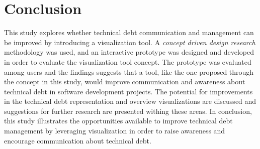 \section{Conclusion}
This study explores whether technical debt communication and management can be improved by introducing a visualization tool.
A \textit{concept driven design research} methodology was used, and an interactive prototype was designed and developed in order to evaluate the visualization tool concept.
The prototype was evaluated among users and the findings suggests that a tool, like the one proposed through the concept in this study, would improve communication and awareness about technical debt in software development projects.
The potential for improvements in the technical debt representation and overview visualizations are discussed and suggestions for further research are presented withing these areas.
In conclusion, this study illustrates the opportunities available to improve technical debt management by leveraging visualization in order to raise awareness and encourage communication about technical debt.